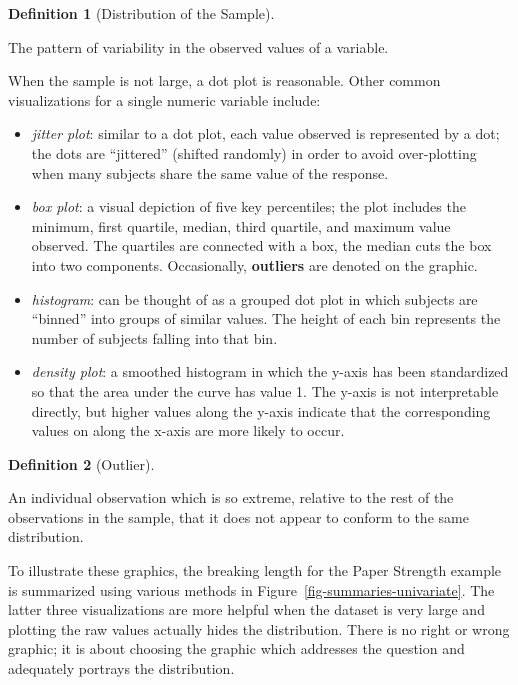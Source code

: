 \documentclass[
  letterpaper,
  DIV=11,
  numbers=noendperiod]{scrreprt}
\providecommand{\tightlist}{%
  \setlength{\itemsep}{0pt}\setlength{\parskip}{0pt}}\usepackage{longtable,booktabs,array}
\theoremstyle{definition}
\theoremstyle{definition}
\newtheorem{definition}{Definition}[chapter]
\theoremstyle{plain}
\theoremstyle{remark}
\begin{document}
\begin{definition}[Distribution of the
Sample]\protect\hypertarget{def-distribution-sample}{}\label{def-distribution-sample}

The pattern of variability in the observed values of a variable.

\end{definition}

When the sample is not large, a dot plot is reasonable. Other common
visualizations for a single numeric variable include:

\begin{itemize}
\tightlist
\item
  \emph{jitter plot}: similar to a dot plot, each value observed is
  represented by a dot; the dots are ``jittered'' (shifted randomly) in
  order to avoid over-plotting when many subjects share the same value
  of the response.
\item
  \emph{box plot}: a visual depiction of five key percentiles; the plot
  includes the minimum, first quartile, median, third quartile, and
  maximum value observed. The quartiles are connected with a box, the
  median cuts the box into two components. Occasionally,
  \textbf{outliers} are denoted on the graphic.
\item
  \emph{histogram}: can be thought of as a grouped dot plot in which
  subjects are ``binned'' into groups of similar values. The height of
  each bin represents the number of subjects falling into that bin.
\item
  \emph{density plot}: a smoothed histogram in which the y-axis has been
  standardized so that the area under the curve has value 1. The y-axis
  is not interpretable directly, but higher values along the y-axis
  indicate that the corresponding values on along the x-axis are more
  likely to occur.
\end{itemize}

\begin{definition}[Outlier]\protect\hypertarget{def-outlier}{}\label{def-outlier}

An individual observation which is so extreme, relative to the rest of
the observations in the sample, that it does not appear to conform to
the same distribution.

\end{definition}

To illustrate these graphics, the breaking length for the Paper Strength
example is summarized using various methods in
Figure~\ref{fig-summaries-univariate}. The latter three visualizations
are more helpful when the dataset is very large and plotting the raw
values actually hides the distribution. There is no right or wrong
graphic; it is about choosing the graphic which addresses the question
and adequately portrays the distribution.
\end{document}
